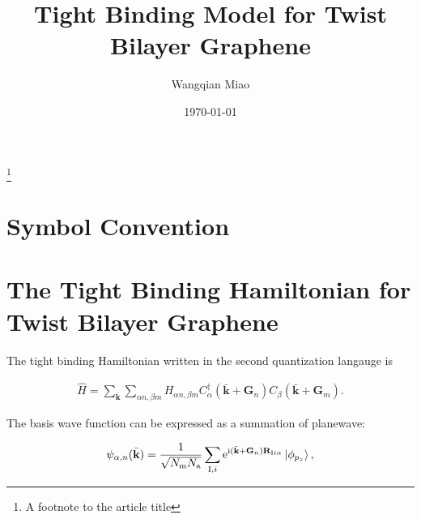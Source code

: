 \documentclass[%
 amsmath,amssymb,
rmp,
]{revtex4-1}
\def \bkbar {\bar{\mathbf{k}}}
\def \bG    {\mathbf{G}}
\def \e     {\mathrm{e}}
\def \I     {\mathrm{I}}
\def \i     {\mathrm{i}}
\def \bR    {\mathbf{R}}
\begin{document}

\title{Tight Binding Model for Twist Bilayer Graphene}%
\thanks{A footnote to the article title}%

\author{Wangqian Miao}

\date{\today}%



\maketitle




\nocite{*}


\section{Symbol Convention}

\section{The Tight Binding Hamiltonian for Twist Bilayer Graphene}

The tight binding Hamiltonian written in the second quantization langauge is

\begin{equation}
\begin{aligned}
\hat{H} = \sum_{\bkbar} \sum_{\alpha n, \beta m} H_{\alpha n, \beta m} C_{\alpha}^\dagger (\bkbar+ \bG_n)C_{\beta}(\bkbar+\bG_m).
\end{aligned}
\end{equation}

The basis wave function can be expressed as a summation of planewave:

\begin{equation}
\psi_{\alpha, n}(\bkbar) = \frac{1}{\sqrt{N_\mathrm{m} N_\mathrm{a}}}\sum_{\I, i} \e^{\i(\bkbar+\bG_n)\bR_{\I i \alpha}} \ket{\phi_{p_z}},
\end{equation}
\end{document}
